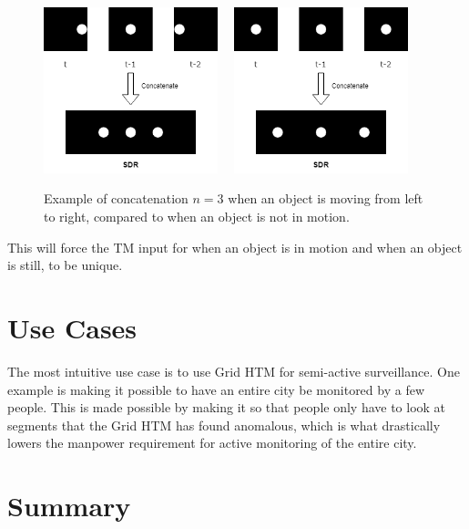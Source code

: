 \begin{figure}[H]
    \centering
    \includegraphics[width=0.45\textwidth]{resources/methodology/temporal_concatenation.png}
    \unskip\ \vrule\
    \includegraphics[width=0.45\textwidth]{resources/methodology/temporal_concatenation_still.png}
    \caption{Example of concatenation $n=3$ when an object is moving from left to right, compared to when an object is not in motion.}
\end{figure}
This will force the TM input for when an object is in motion and when an object is still, to be unique.
\section{Use Cases}
The most intuitive use case is to use Grid HTM for semi-active surveillance. One example is making it possible to have an entire city be monitored by a few people. This is made possible by making it so that people only have to look at segments that the Grid HTM has found anomalous, which is what drastically lowers the manpower requirement for active monitoring of the entire city.
\section{Summary}
